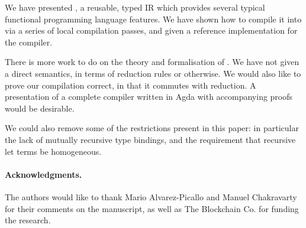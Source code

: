 We have presented \FIR{}, a reusable, typed IR which provides several typical
functional programming language features. We have shown how to compile it into
\FOMF{} via a series of local compilation passes, and given a reference
implementation for the compiler.

There is more work to do on the theory and formalisation of \FIR{}. We
have not given a direct semantics, in terms of reduction rules or otherwise.
We would also like to prove our compilation correct, in that it commutes with
reduction. A presentation of a complete compiler written in Agda with
accompanying proofs would be desirable.

We could also remove some of the restrictions present in this paper: in
particular the lack of mutually recursive type bindings, and the
requirement that recursive let terms be homogeneous.

\paragraph{Acknowledgments.}
The authors would like to thank Mario Alvarez-Picallo and Manuel Chakravarty
for their comments on the manuscript, as well as The Blockchain Co. for funding the research.





